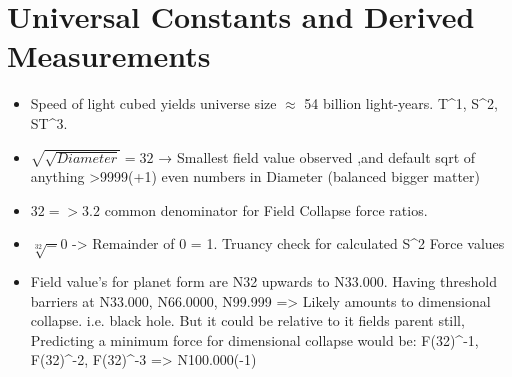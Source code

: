 \documentclass[12pt]{thesis}
\begin{document}
\section{Universal Constants and Derived Measurements}
\begin{itemize}
    \item Speed of light cubed yields universe size $\approx$ 54 billion light-years. T^1, S^2, ST^3.
    \item $\sqrt{\sqrt{Diameter}} = 32$ → Smallest field value observed ,and default sqrt of anything >9999(+1) even numbers in Diameter (balanced bigger matter) 
    \item {$32 => 3.2$} common denominator for Field Collapse force ratios.
    \item $\sqrt[32] = 0$ -> Remainder of 0 = 1. Truancy check for calculated S^2 Force values
    \item Field value's for planet form are N32 upwards to N33.000. Having threshold barriers at N33.000, N66.0000, N99.999 => Likely amounts to dimensional collapse. i.e. black hole. But it could be relative to it fields parent still, Predicting a minimum force for dimensional collapse would be:
    F(32)^-1, F(32)^-2, F(32)^-3 => N100.000(-1)

    
\end{itemize}
\end{document}
